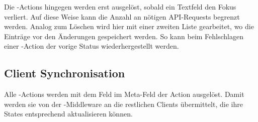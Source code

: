 Die -Actions hingegen werden erst ausgelöst, sobald ein Textfeld
den Fokus verliert.  Auf diese Weise kann die Anzahl an nötigen API-Requests
begrenzt werden.  Analog zum Löschen wird hier mit einer zweiten Liste
gearbeitet, wo die Einträge vor den Änderungen gespeichert werden.  So kann beim
Fehlschlagen einer -Action der vorige Status
wiederhergestellt werden.

\subsection{Client Synchronisation}
\label{ssec:fc_client_synchronisation}

Alle -Actions werden mit dem Feld  im
Meta-Feld der Action ausgelöst.  Damit werden sie von der
-Middleware an die restlichen Clients übermittelt, die ihre
States entsprechend aktualisieren können.
